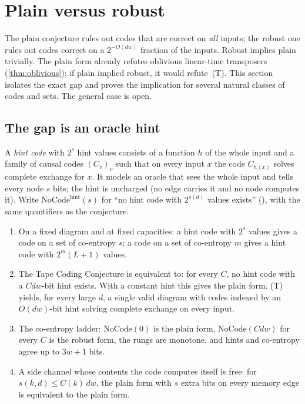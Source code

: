 \section{Plain versus robust}\label{sec:plainrobust}

The plain conjecture rules out codes that are correct on \emph{all} inputs; the robust one rules out
codes correct on a $2^{-O(dw)}$ fraction of the inputs. Robust implies plain trivially. The plain
form already refutes oblivious linear-time transposers (\cref{thm:oblivious}); if plain implied
robust, it would refute~(T). This section isolates the exact gap and proves the implication for
several natural classes of codes and sets. The general case is open.

\subsection{The gap is an oracle hint}

A \emph{hint code} with $2^s$ hint values consists of a function $h$ of the whole input and a family
of causal codes $(C_v)_v$ such that on every input $x$ the code $C_{h(x)}$ solves complete exchange
for $x$. It models an oracle that sees the whole input and tells every node $s$ bits; the hint is
uncharged (no edge carries it and no node computes it). Write $\mathrm{NoCode}^{\mathrm{hint}}(s)$
for ``no hint code with $2^{s(d)}$ values exists'' (), with the same
quantifiers as the conjecture.

\begin{theorem}\label{thm:hint}
\begin{enumerate}[label=(\alph*)]
\item On a fixed diagram and at fixed capacities: a hint code with $2^s$ values gives a code on a set
of co-entropy $s$; a code on a set of co-entropy $m$ gives a hint code with $2^m(L+1)$ values.
\item The Tape Coding Conjecture is equivalent to: for every $C$, no hint code with a $Cdw$-bit
hint exists. With a constant hint this gives the plain form. (T) yields, for every large $d$, a single
valid diagram with codes indexed by an $O(dw)$-bit hint solving complete exchange on every input.
\item The co-entropy ladder: $\mathrm{NoCode}(0)$ is the plain form, $\mathrm{NoCode}(Cdw)$ for every
$C$ is the robust form, the rungs are monotone, and hints and co-entropy agree up to $3w+1$ bits.
\item A side channel whose contents the code computes itself is free: for $s(k,d)\le C(k)\,dw$, the
plain form with $s$ extra bits on every memory edge is equivalent to the plain form.
\end{enumerate}
\end{theorem}


